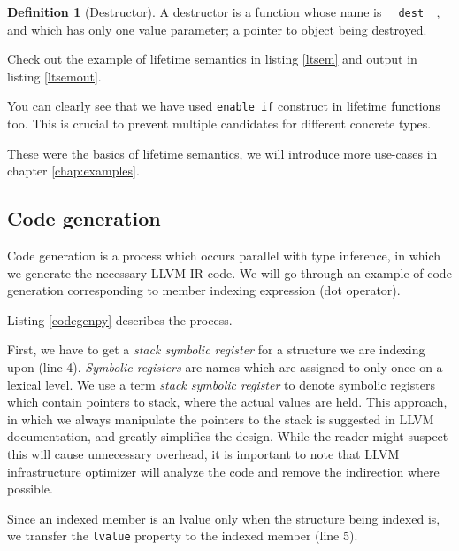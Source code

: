 \documentclass[times, utf8, diplomski]{fer}
\theoremstyle{definition}
\newtheorem{definition}{Definition}[]
\newcommand{\pythoncode}[3]{
    
}
\newcommand{\textcode}[3]{
    
}
\begin{document}
\begin{definition}[Destructor]
A destructor is a function whose name is \texttt{\_\_dest\_\_}, and which has only one value parameter;
a pointer to object being destroyed.
\end{definition}

Check out the example of lifetime semantics in listing \ref{ltsem} and output in listing \ref{ltsemout}.

\textcode{\resdir/compiler/lifetime_ex.agt}{ltsem}{Lifetime semantics}
\textcode{\resdir/compiler/lifetime_ex.out}{ltsemout}{Lifetime semantics - output}

You can clearly see that we have used \texttt{enable\_if} construct in lifetime functions too.
This is crucial to prevent multiple candidates for different concrete types.

These were the basics of lifetime semantics, we will introduce more use-cases
in chapter \ref{chap:examples}.

\subsection{Code generation}

Code generation is a process which occurs parallel with type inference, in
which we generate the necessary LLVM-IR code. We will go through an example of
code generation corresponding to member indexing expression (dot operator).

\pythoncode{\resdir/compiler/code_gen.py}{codegenpy}{Code generation for dot operator}

Listing \ref{codegenpy} describes the process. 

First, we have to get a \textit{stack symbolic register}
for a structure we are indexing upon (line 4). \textit{Symbolic registers} are
names which are assigned to only once on a lexical level. We use a term \textit{stack symbolic register}
to denote symbolic registers which contain pointers to stack, where the actual values are held.
This approach, in which we always manipulate the pointers to the stack is suggested in LLVM documentation,
and greatly simplifies the design. While the reader might suspect this will cause unnecessary
overhead, it is important to note that LLVM infrastructure optimizer will analyze the code and remove
the indirection where possible. 

Since an indexed member is an lvalue only when the structure being indexed is, 
we transfer the \texttt{lvalue} property to the indexed member (line 5).
\end{document}
